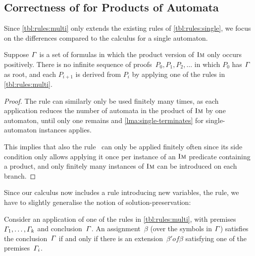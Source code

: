 \documentclass[acmsmall,review,anonymous,screen]{acmart}\settopmatter{printfolios=true,printccs=true,printacmref=true}
\theoremstyle{definition}
\begin{document}
\subsection{Correctness of \Calculus{} for Products of Automata}

Since \cref{tbl:rules:multi} only extends the existing rules of
\cref{tbl:rules:single}, we focus on the differences compared
to the calculus for a single automaton.

\begin{lemma}\label{lma:multi-terminates}
  Suppose $\varGamma{}$ is a set of formulas in which the product
  version of $\operatorname{\textsc{Im}}$ only occurs positively. There is no
  infinite sequence of proofs~$P_0, P_1, P_2, \ldots$ in which $P_0$
  has $\varGamma{}$ as root, and each $P_{i+1}$ is derived from
  $P_i$ by applying one of the rules in \cref{tbl:rules:multi}.
\end{lemma}

\begin{proof}
  The rule \Materialise{} can similarly only be used finitely many times, as
  each application reduces the number of automata in the product of $\operatorname{\textsc{Im}}$ by
  one automaton, until only one remains and \cref{lma:single-terminates} for
  single-automaton instances applies.
  
  This implies that also the rule~\ExpandM{} can only be applied
  finitely often since its side condition only allows applying it once
  per instance of an $\operatorname{\textsc{Im}}$ predicate containing a product, and only finitely
  many instances of $\operatorname{\textsc{Im}}$ can be introduced on each branch.
\end{proof}


Since our calculus now includes a rule introducing new variables, the
\Materialise{} rule, we have to slightly generalise the notion of
solution-preservation:
%
\begin{lemma}\label{lma:multi-correct}
  Consider an application of one of the rules in
  \cref{tbl:rules:multi}, with
  premises~$\varGamma_1, \ldots, \varGamma_k$ and
  conclusion~$\varGamma$. An assignment~$\beta$ (over the symbols in
  $\varGamma$) satisfies the conclusion~$\varGamma$ if and only if
  there is an extension~$\beta' of \beta$ satisfying one of the
  premises~$\varGamma_i$.
\end{lemma}
\end{document}
